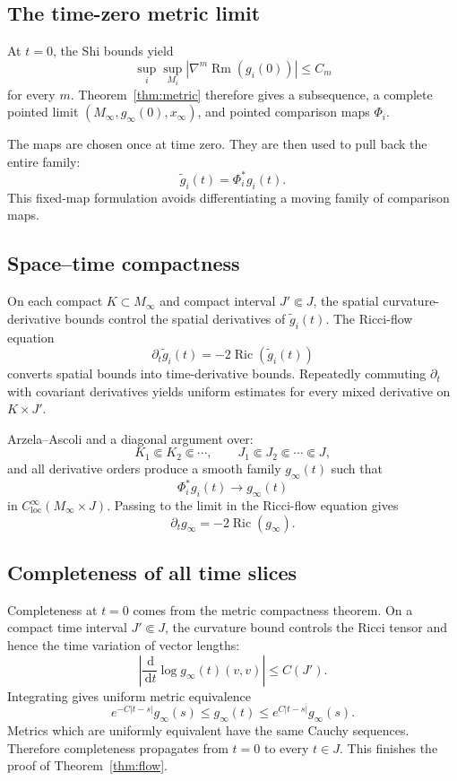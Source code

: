 \documentclass[11pt]{article}
\theoremstyle{plain}
\theoremstyle{definition}
\theoremstyle{remark}
\newcommand{\Rm}{\operatorname{Rm}}
\newcommand{\Ric}{\operatorname{Ric}}
\newcommand{\dd}{\,\mathrm d}
\newcommand{\norm}[1]{\left|#1\right|}
\begin{document}
\subsection{The time-zero metric limit}

At \(t=0\), the Shi bounds yield
\[
  \sup_i\sup_{M_i}\norm{\nabla^m\Rm(g_i(0))}\leq C_m
\]
for every \(m\).  Theorem~\ref{thm:metric} therefore gives a subsequence, a
complete pointed limit \((M_\infty,g_\infty(0),x_\infty)\), and pointed
comparison maps \(\Phi_i\).

The maps are chosen once at time zero.  They are then used to pull back the
entire family:
\[
  \widetilde g_i(t)=\Phi_i^*g_i(t).
\]
This fixed-map formulation avoids differentiating a moving family of
comparison maps.

\subsection{Space--time compactness}

On each compact \(K\subset M_\infty\) and compact interval \(J'\Subset J\),
the spatial curvature-derivative bounds control the spatial derivatives of
\(\widetilde g_i(t)\).  The Ricci-flow equation
\[
  \partial_t\widetilde g_i(t)
  =
  -2\Ric(\widetilde g_i(t))
\]
converts spatial bounds into time-derivative bounds.  Repeatedly commuting
\(\partial_t\) with covariant derivatives yields uniform estimates for every
mixed derivative on \(K\times J'\).

Arzela--Ascoli and a diagonal argument over:
\[
  K_1\Subset K_2\Subset\cdots,\qquad
  J_1\Subset J_2\Subset\cdots\Subset J,
\]
and all derivative orders produce a smooth family \(g_\infty(t)\) such that
\[
  \Phi_i^*g_i(t)\longrightarrow g_\infty(t)
\]
in \(C^\infty_{\mathrm{loc}}(M_\infty\times J)\).
Passing to the limit in the Ricci-flow equation gives
\[
  \partial_tg_\infty=-2\Ric(g_\infty).
\]

\subsection{Completeness of all time slices}

Completeness at \(t=0\) comes from the metric compactness theorem.  On a
compact time interval \(J'\Subset J\), the curvature bound controls the
Ricci tensor and hence the time variation of vector lengths:
\[
  \left|\frac{\dd}{\dd t}\log g_\infty(t)(v,v)\right|
  \leq C(J').
\]
Integrating gives uniform metric equivalence
\[
  e^{-C|t-s|}g_\infty(s)
  \leq g_\infty(t)
  \leq e^{C|t-s|}g_\infty(s).
\]
Metrics which are uniformly equivalent have the same Cauchy sequences.
Therefore completeness propagates from \(t=0\) to every \(t\in J\).  This
finishes the proof of Theorem~\ref{thm:flow}.
\end{document}
